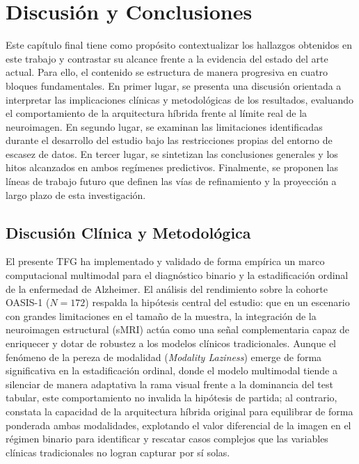 \documentclass[12pt, oneside, english, spanish]{book}
\begin{document}
\chapter{Discusión y Conclusiones} \label{chap:discusion_conclusiones}

Este capítulo final tiene como propósito contextualizar los hallazgos obtenidos en este trabajo y contrastar su alcance frente a la evidencia del estado del arte actual. Para ello, el contenido se estructura de manera progresiva en cuatro bloques fundamentales. En primer lugar, se presenta una discusión orientada a interpretar las implicaciones clínicas y metodológicas de los resultados, evaluando el comportamiento de la arquitectura híbrida frente al límite real de la neuroimagen. En segundo lugar, se examinan las limitaciones identificadas durante el desarrollo del estudio bajo las restricciones propias del entorno de escasez de datos. En tercer lugar, se sintetizan las conclusiones generales y los hitos alcanzados en ambos regímenes predictivos. Finalmente, se proponen las líneas de trabajo futuro que definen las vías de refinamiento y la proyección a largo plazo de esta investigación.

\section{Discusión Clínica y Metodológica} \label{sec:discusion_clinica}

El presente TFG ha implementado y validado de forma empírica un marco computacional multimodal para el diagnóstico binario y la estadificación ordinal de la enfermedad de Alzheimer. El análisis del rendimiento sobre la cohorte OASIS-1 ($N = 172$) respalda la hipótesis central del estudio: que en un escenario con grandes limitaciones en el tamaño de la muestra, la integración de la neuroimagen estructural (sMRI) actúa como una señal complementaria capaz de enriquecer y dotar de robustez a los modelos clínicos tradicionales. Aunque el fenómeno de la pereza de modalidad (\textit{Modality Laziness}) emerge de forma significativa en la estadificación ordinal, donde el modelo multimodal tiende a silenciar de manera adaptativa la rama visual frente a la dominancia del test tabular, este comportamiento no invalida la hipótesis de partida; al contrario, constata la capacidad de la arquitectura híbrida original para equilibrar de forma ponderada ambas modalidades, explotando el valor diferencial de la imagen en el régimen binario para identificar y rescatar casos complejos que las variables clínicas tradicionales no logran capturar por sí solas.
\end{document}

